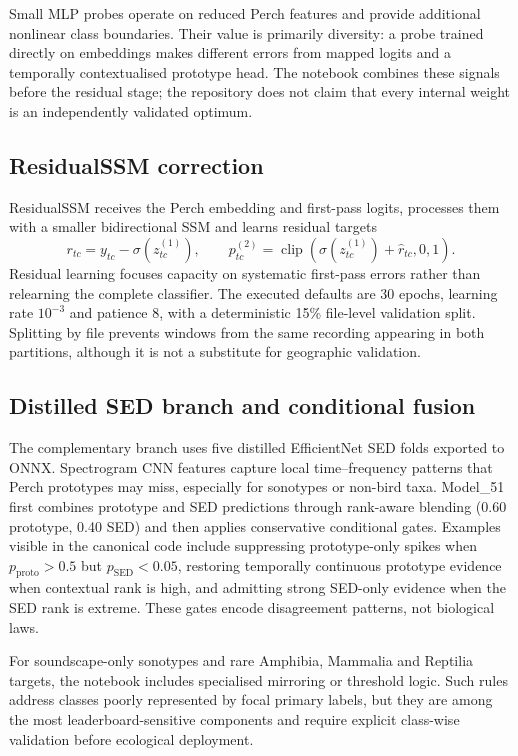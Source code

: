 \documentclass[10pt,a4paper]{article}
\begin{document}
Small MLP probes operate on reduced Perch features and provide additional nonlinear class boundaries. Their value is primarily diversity: a probe trained directly on embeddings makes different errors from mapped logits and a temporally contextualised prototype head. The notebook combines these signals before the residual stage; the repository does not claim that every internal weight is an independently validated optimum.

\subsection{ResidualSSM correction}
ResidualSSM receives the Perch embedding and first-pass logits, processes them with a smaller bidirectional SSM and learns residual targets
\begin{equation}
r_{tc}=y_{tc}-\sigma(z^{(1)}_{tc}), \qquad
p^{(2)}_{tc}=\operatorname{clip}\!\left(\sigma(z^{(1)}_{tc})+\hat r_{tc},0,1\right).
\end{equation}
Residual learning focuses capacity on systematic first-pass errors rather than relearning the complete classifier. The executed defaults are 30 epochs, learning rate $10^{-3}$ and patience 8, with a deterministic 15\% file-level validation split. Splitting by file prevents windows from the same recording appearing in both partitions, although it is not a substitute for geographic validation.

\subsection{Distilled SED branch and conditional fusion}
The complementary branch uses five distilled EfficientNet SED folds exported to ONNX. Spectrogram CNN features capture local time--frequency patterns that Perch prototypes may miss, especially for sonotypes or non-bird taxa. Model\_51 first combines prototype and SED predictions through rank-aware blending (0.60 prototype, 0.40 SED) and then applies conservative conditional gates. Examples visible in the canonical code include suppressing prototype-only spikes when $p_{\mathrm{proto}}>0.5$ but $p_{\mathrm{SED}}<0.05$, restoring temporally continuous prototype evidence when contextual rank is high, and admitting strong SED-only evidence when the SED rank is extreme. These gates encode disagreement patterns, not biological laws.

For soundscape-only sonotypes and rare Amphibia, Mammalia and Reptilia targets, the notebook includes specialised mirroring or threshold logic. Such rules address classes poorly represented by focal primary labels, but they are among the most leaderboard-sensitive components and require explicit class-wise validation before ecological deployment.
\end{document}
